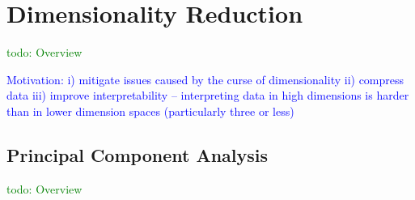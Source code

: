 \section{Dimensionality Reduction}

\textcolor{green}{todo: Overview}

\textcolor{blue}{Motivation: i) mitigate issues caused by the curse of dimensionality ii) compress data iii) improve interpretability -- interpreting data in high dimensions is harder than in lower dimension spaces (particularly three or less) }

\subsection{Principal Component Analysis}

\textcolor{green}{todo: Overview}